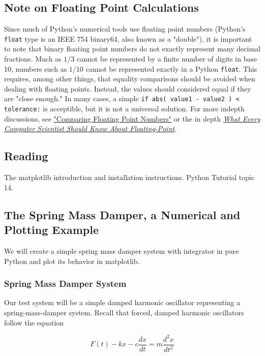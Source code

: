 \documentclass{report}
\begin{document}
\subsection*{Note on Floating Point Calculations}
Since much of Python's numerical tools use floating point numbers (Python's \verb|float| type is an IEEE 754 binary64, also known as a "double"), it is important to note that binary floating point numbers do not exactly represent many decimal fractions. Much as $1/3$ cannot be represented by a finite number of digits in base 10, numbers such as $1/10$ cannot be represented exactly in a Python \verb|float|. This requires, among other things, that equality comparisons should be avoided when dealing with floating points. Instead, the values should considered equal if they are "close enough." In many cases, a simple \verb|if abs( value1 - value2 ) < tolerance:| is acceptible, but it is not a universal solution. For more indepth discussions, see \href{http://www.cygnus-software.com/papers/comparingfloats/comparingfloats.htm}{"Comparing Floating Point Numbers"}  or the in depth \href{http://www.cse.msu.edu/~cse320/Documents/FloatingPoint.pdf}{\emph{What Every Computer Scientist Should Know About Floating-Point}}.

\subsection{Reading}
The matplotlib introduction and installation instructions. Python Tutorial topic 14.

\subsection{The Spring Mass Damper, a Numerical and Plotting Example}

We will create a simple spring mass damper system with integrator in pure Python and plot its behavior in matplotlib.

\subsubsection{Spring Mass Damper System}

Our test system will be a simple damped harmonic oscillator representing a spring-mass-damper system. Recall that forced, damped harmonic oscillators follow the equation\cite{website:wikipedia}

\begin{displaymath}
F(t)-kx-c\frac{dx}{dt}=m\frac{d^2x}{dt^2}
\end{displaymath}
\end{document}

